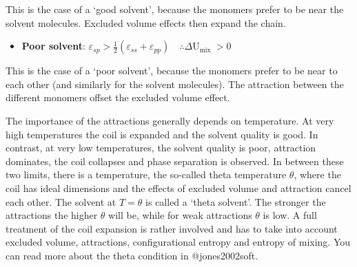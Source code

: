 \documentclass[
  letterpaper,
  enabledeprecatedfontcommands]{report}
\providecommand{\tightlist}{%
  \setlength{\itemsep}{0pt}\setlength{\parskip}{0pt}}
\begin{document}
This is the case of a `good solvent', because the monomers prefer to be
near the solvent molecules. Excluded volume effects then expand the
chain.

\begin{itemize}
\tightlist
\item
  \textbf{Poor solvent}:
  \(\varepsilon_{s p}>\frac{1}{2}\left(\varepsilon_{s s}+\varepsilon_{p p}\right) \quad \therefore \Delta \mathrm{U}_{\text {mix }}>0\)
\end{itemize}

This is the case of a `poor solvent', because the monomers prefer to be
near to each other (and similarly for the solvent molecules). The
attraction between the different monomers offset the excluded volume
effect.

The importance of the attractions generally depends on temperature. At
very high temperatures the coil is expanded and the solvent quality is
good. In contrast, at very low temperatures, the solvent quality is
poor, attraction dominates, the coil collapses and phase separation is
observed. In between these two limits, there is a temperature, the
so-called theta temperature \(\theta\), where the coil has ideal
dimensions and the effects of excluded volume and attraction cancel each
other. The solvent at \(T=\theta\) is called a `theta solvent'. The
stronger the attractions the higher \(\theta\) will be, while for weak
attractions \(\theta\) is low. A full treatment of the coil expansion is
rather involved and has to take into account excluded volume,
attractions, configurational entropy and entropy of mixing. You can read
more about the theta condition in @jones2002soft.
\end{document}
